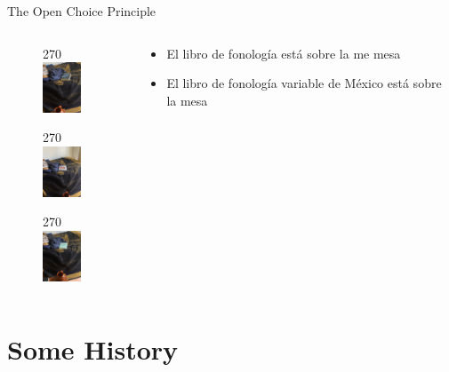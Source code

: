 \documentclass{beamer}
\begin{document}
\begin{frame}{The Open Choice Principle}
	\begin{columns}
    	\begin{column}{6cm}
        	\begin{figure}
            	\begin{turn}{270}
    			\includegraphics[height=1.5cm]{pbm.JPG}
                \end{turn}
            \end{figure}
            \begin{figure}
            	\begin{turn}{270}
    			\includegraphics[height=1.5cm]{hayes.JPG}
                \end{turn}
            \end{figure}
            \begin{figure}
            	\begin{turn}{270}
    			\includegraphics[height=1.5cm]{sonoro.JPG}
                \end{turn}
            \end{figure}
        \end{column}
        \begin{column}{6cm}
        \begin{itemize}
        \item El libro de fonología está sobre la me mesa
        \item El libro de fonología variable de México está sobre la mesa
        \end{itemize}
        \end{column}
    \end{columns}
\end{frame}



\section{Some History}
\end{document}

